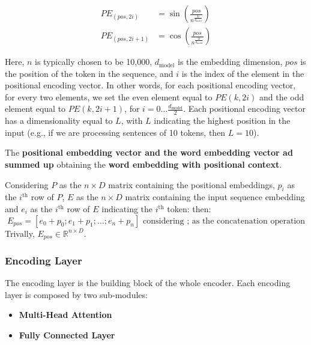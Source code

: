 \documentclass[12pt]{article}
\begin{document}
\begin{equation}
    \begin{aligned}
        PE_{(pos, 2i)} &= \sin \left( \frac{pos}{n^{\frac{2i}{d_{\text{model}}}}} \right) \\
        PE_{(pos, 2i+1)} &= \cos \left( \frac{pos}{n^{\frac{2i}{d_{\text{model}}}}} \right)
    \end{aligned}
    \label{eq:transformer_positional_encoding}
\end{equation}    

Here, $n$ is typically chosen to be 10,000, $d_{\text{model}}$ is the embedding dimension, $pos$ is 
the position of the token in the sequence, and $i$ is the index of the element in the positional encoding 
vector. In other words, for each positional encoding vector, for every two elements, we set the even element 
equal to $PE(k, 2i)$ and the odd element equal to $PE(k, 2i + 1)$, for 
$i = 0 \ldots \frac{d_{\text{model}}}{2}$. Each positional encoding vector has a dimensionality equal 
to $L$, with $L$ indicating the highest position in the input (e.g., if we are processing sentences of 
10 tokens, then $L = 10$). 

The \textbf{positional embedding vector and the word embedding vector ad summed up} obtaining the \textbf{word embedding with 
positional context}.

Considering $P$ as the $n \times D$ matrix containing the positional embeddings, 
$p_i$ as the $i^{\text{th}}$ row of $P$, $E$ as the $n \times D$ matrix containing the input sequence embedding and 
$e_i$ as the $i^{\text{th}}$ row of $E$ indicating the $i^{\text{th}}$ token:
then:
\begin{equation}
    E_{pos} = [e_0 + p_0; e_1 + p_1; \dots ; e_n + p_n] \text{ considering ; as the concatenation operation}
\end{equation}
Trivally, $E_{pos} \in \mathbb{R}^{n \times D}$.

\subsubsection{Encoding Layer}
The encoding layer is the building block of the whole encoder. Each encoding layer is composed by two sub-modules:
\begin{itemize}
    \item \textbf{Multi-Head Attention}
    \item \textbf{Fully Connected Layer}
\end{itemize}
\end{document}
